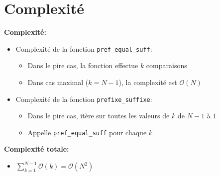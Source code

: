 \section{Complexité}\label{complexite}

\textbf{Complexité:}

\begin{itemize}
    \item Complexité de la fonction \texttt{pref\_equal\_suff}:
        \begin{itemize}
            \item Dans le pire cas, la fonction effectue $k$ comparaisons
            \item Dans cas maximal ($k = N-1$), la complexité est $\mathcal{O}(N)$
        \end{itemize}

    \item Complexité de la fonction \texttt{prefixe\_suffixe}:
        \begin{itemize}
            \item Dans le pire cas, itère sur toutes les valeurs de $k$ de $N-1$ à $1$
            \item Appelle \texttt{pref\_equal\_suff} pour chaque $k$
        \end{itemize}

\end{itemize}

\bigskip

\textbf{Complexité totale:}
    \begin{itemize}
        \item $\sum_{k=1}^{N-1} \mathcal{O}(k) = \mathcal{O}(N^2)$
    \end{itemize}
